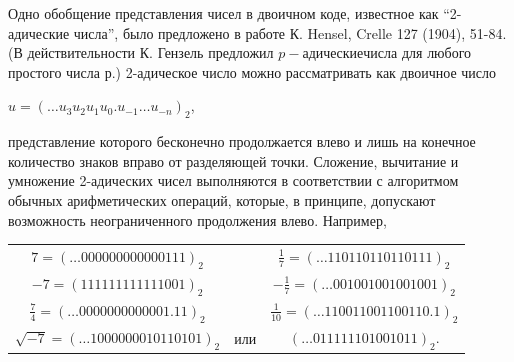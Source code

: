 \paragraphT{}  Одно обобщение представления чисел в двоичном коде, известное как \textquotedblleft 2-адические числа\textquotedblright, было предложено в работе К. Hensel, Crelle 127 (1904), 51-84. (В действительности К. Гензель предложил $p-адические числа$ для любого простого числа р.) 2-адическое число можно рассматривать как двоичное число
\begin{center}
$u = ( \ldots u_{3}u_{2}u_{1}u_{0}.u_{-1}  \ldots  u_{-n})_{2}$,
\end{center}

представление которого бесконечно продолжается влево и лишь на конечное количество знаков вправо от разделяющей точки. Сложение, вычитание и умножение 2-адических чисел выполняются в соответствии с алгоритмом обычных арифметических операций, которые, в принципе, допускают возможность неограниченного продолжения влево. Например,

\begin{center}
\begin{tabular}{c c c}
$ 7 = ( \ldots 000000000000111)_{2} $ & & $ \frac{1}{7} = ( \ldots 110110110110111)_{2} $\\

$-7 = (111111111111001)_{2}$ & & $- \frac{1}{7} = ( \ldots 001001001001001)_{2}$\\

$\frac{7}{4} = ( \ldots 0000000000001.11)_{2}$ & & $\frac{1}{10} = ( \ldots 110011001100110.1)_{2}$\\

$\sqrt{-7} = ( \ldots 1000000010110101)_{2}$ & или & $( \ldots 011111101001011)_{2}$.
\end{tabular}
\end{center}

